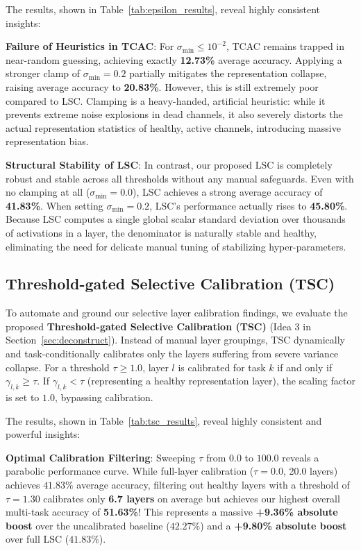 \documentclass{article}
\theoremstyle{plain}
\theoremstyle{definition}
\theoremstyle{remark}
\begin{document}
The results, shown in Table~\ref{tab:epsilon_results}, reveal highly consistent insights:

\textbf{Failure of Heuristics in TCAC}: For $\sigma_{\min} \le 10^{-2}$, TCAC remains trapped in near-random guessing, achieving exactly \textbf{12.73\%} average accuracy. Applying a stronger clamp of $\sigma_{\min} = 0.2$ partially mitigates the representation collapse, raising average accuracy to \textbf{20.83\%}. However, this is still extremely poor compared to LSC. Clamping is a heavy-handed, artificial heuristic: while it prevents extreme noise explosions in dead channels, it also severely distorts the actual representation statistics of healthy, active channels, introducing massive representation bias.

\textbf{Structural Stability of LSC}: In contrast, our proposed LSC is completely robust and stable across all thresholds without any manual safeguards. Even with no clamping at all ($\sigma_{\min} = 0.0$), LSC achieves a strong average accuracy of \textbf{41.83\%}. When setting $\sigma_{\min} = 0.2$, LSC's performance actually rises to \textbf{45.80\%}. Because LSC computes a single global scalar standard deviation over thousands of activations in a layer, the denominator is naturally stable and healthy, eliminating the need for delicate manual tuning of stabilizing hyper-parameters.

\subsection{Threshold-gated Selective Calibration (TSC)}
\label{sec:tsc}
To automate and ground our selective layer calibration findings, we evaluate the proposed \textbf{Threshold-gated Selective Calibration (TSC)} (Idea 3 in Section~\ref{sec:deconstruct}). Instead of manual layer groupings, TSC dynamically and task-conditionally calibrates only the layers suffering from severe variance collapse. For a threshold $\tau \ge 1.0$, layer $l$ is calibrated for task $k$ if and only if $\gamma_{l,k} \ge \tau$. If $\gamma_{l,k} < \tau$ (representing a healthy representation layer), the scaling factor is set to $1.0$, bypassing calibration.

The results, shown in Table~\ref{tab:tsc_results}, reveal highly consistent and powerful insights:

\textbf{Optimal Calibration Filtering}: Sweeping $\tau$ from $0.0$ to $100.0$ reveals a parabolic performance curve. While full-layer calibration ($\tau = 0.0$, 20.0 layers) achieves $41.83\%$ average accuracy, filtering out healthy layers with a threshold of $\tau = 1.30$ calibrates only \textbf{6.7 layers} on average but achieves our highest overall multi-task accuracy of \textbf{51.63\%}! This represents a massive \textbf{+9.36\% absolute boost} over the uncalibrated baseline ($42.27\%$) and a \textbf{+9.80\% absolute boost} over full LSC ($41.83\%$).
\end{document}
